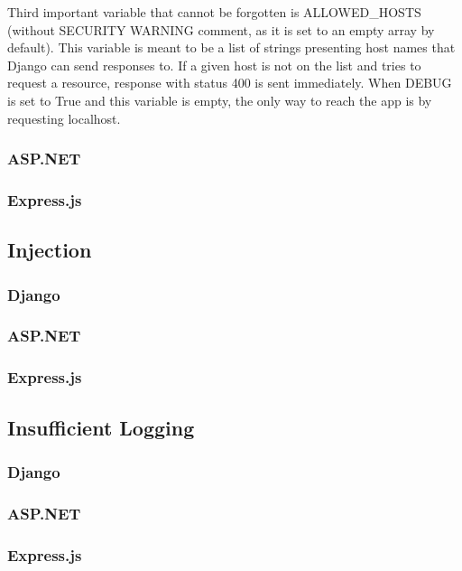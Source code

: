 Third important variable that cannot be forgotten is ALLOWED\_HOSTS (without SECURITY WARNING comment, as it is set to an empty array by default). This variable is meant to be a list of strings presenting host names that Django can send responses to. If a given host is not on the list and tries to request a resource, response with status 400 is sent immediately. When DEBUG is set to True and this variable is empty, the only way to reach the app is by requesting localhost.


\subsubsection{ASP.NET}
\subsubsection{Express.js}
\subsection{Injection}
\subsubsection{Django}
\subsubsection{ASP.NET}
\subsubsection{Express.js}
\subsection{Insufficient Logging}
\subsubsection{Django}
\subsubsection{ASP.NET}
\subsubsection{Express.js}

